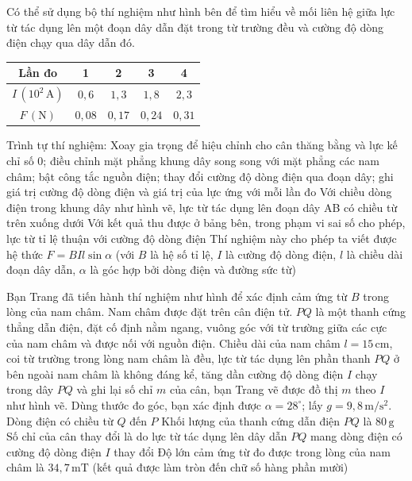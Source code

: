 \documentclass[12pt,a4paper]{article}
\begin{document}
\begin{ex}
	Có thể sử dụng bộ thí nghiệm như hình bên để tìm hiểu về mối liên hệ giữa lực từ tác dụng lên một đoạn dây dẫn đặt trong từ trường đều và cường độ dòng điện chạy qua dây dẫn đó.
	\begin{center}
		\begin{tabular}{|c|c|c|c|c|}
			\hline
			Lần đo & 1 & 2 & 3 & 4 \\
			\hline
			$I \, (10^2 \, \mathrm{A})$ & $0{,}6$ & $1{,}3$ & $1{,}8$ & $2{,}3$ \\
			\hline
			$F \, (\mathrm{N})$ & $0{,}08$ & $0{,}17$ & $0{,}24$ & $0{,}31$ \\
			\hline
		\end{tabular}
	\end{center}
	\choiceTF
	{Trình tự thí nghiệm: Xoay gia trọng để hiệu chỉnh cho cân thăng bằng và lực kế chỉ số 0; điều chỉnh mặt phẳng khung dây song song với mặt phẳng các nam châm; bật công tắc nguồn điện; thay đổi cường độ dòng điện qua đoạn dây; ghi giá trị cường độ dòng điện và giá trị của lực ứng với mỗi lần đo}
	{Với chiều dòng điện trong khung dây như hình vẽ, lực từ tác dụng lên đoạn dây AB có chiều từ trên xuống dưới}
	{Với kết quả thu được ở bảng bên, trong phạm vi sai số cho phép, lực từ tỉ lệ thuận với cường độ dòng điện}
	{Thí nghiệm này cho phép ta viết được hệ thức $F = BI l \sin\alpha$ (với $B$ là hệ số tỉ lệ, $I$ là cường độ dòng điện, $l$ là chiều dài đoạn dây dẫn, $\alpha$ là góc hợp bởi dòng điện và đường sức từ)}
\end{ex}

\begin{ex}
	Bạn Trang đã tiến hành thí nghiệm như hình để xác định cảm ứng từ $B$ trong lòng của nam châm. Nam châm được đặt trên cân điện tử. $PQ$ là một thanh cứng thẳng dẫn điện, đặt cố định nằm ngang, vuông góc với từ trường giữa các cực của nam châm và được nối với nguồn điện. Chiều dài của nam châm $l = 15 \, \mathrm{cm}$, coi từ trường trong lòng nam châm là đều, lực từ tác dụng lên phần thanh $PQ$ ở bên ngoài nam châm là không đáng kể, tăng dần cường độ dòng điện $I$ chạy trong dây $PQ$ và ghi lại số chỉ $m$ của cân, bạn Trang vẽ được đồ thị $m$ theo $I$ như hình vẽ. Dùng thước đo góc, bạn xác định được $\alpha = 28^\circ$; lấy $g = 9{,}8 \, \mathrm{m/s^2}$.
	\choiceTF
	{Dòng điện có chiều từ $Q$ đến $P$}
	{Khối lượng của thanh cứng dẫn điện $PQ$ là $80 \, \mathrm{g}$}
	{Số chỉ của cân thay đổi là do lực từ tác dụng lên dây dẫn $PQ$ mang dòng điện có cường độ dòng điện $I$ thay đổi}
	{Độ lớn cảm ứng từ đo được trong lòng của nam châm là $34{,}7 \, \mathrm{mT}$ (kết quả được làm tròn đến chữ số hàng phần mười)}
\end{ex}
\end{document}
